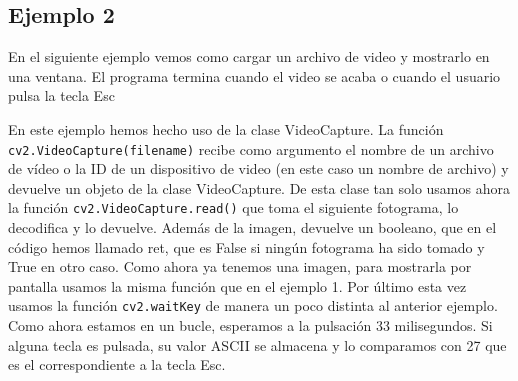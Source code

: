 \documentclass[a4paper,openright, 12pt]{book}
\begin{document}
\newpage

\subsection*{Ejemplo 2}
En el siguiente ejemplo vemos como cargar un archivo de video y mostrarlo en una ventana. El programa termina cuando el video se acaba o cuando el usuario pulsa la tecla Esc

En este ejemplo hemos hecho uso de la clase VideoCapture.
La función \lstinline|cv2.VideoCapture(filename)| recibe como argumento el nombre de un archivo de vídeo o la ID de un dispositivo de video (en este caso un nombre de archivo) y devuelve un objeto de la clase VideoCapture.
De esta clase tan solo usamos ahora la función \lstinline|cv2.VideoCapture.read()| que toma el siguiente fotograma, lo decodifica y lo devuelve. Además de la imagen, devuelve un booleano, que en el código hemos llamado ret, que es False si ningún fotograma ha sido tomado y True en otro caso.
Como ahora ya tenemos una imagen, para mostrarla por pantalla usamos la misma función que en el ejemplo 1.
Por último esta vez usamos la función \lstinline|cv2.waitKey| de manera un poco distinta al anterior ejemplo. Como ahora estamos en un bucle, esperamos a la pulsación 33 milisegundos. Si alguna tecla es pulsada, su valor ASCII se almacena y lo comparamos con 27 que es el correspondiente a la tecla Esc.

\newpage
\end{document}
